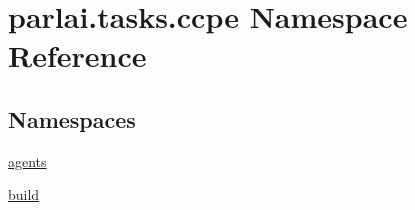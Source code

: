 \hypertarget{namespaceparlai_1_1tasks_1_1ccpe}{}\section{parlai.\+tasks.\+ccpe Namespace Reference}
\label{namespaceparlai_1_1tasks_1_1ccpe}
\subsection*{Namespaces}
\begin{DoxyCompactItemize}
\item 
 \hyperlink{namespaceparlai_1_1tasks_1_1ccpe_1_1agents}{agents}
\item 
 \hyperlink{namespaceparlai_1_1tasks_1_1ccpe_1_1build}{build}
\end{DoxyCompactItemize}
